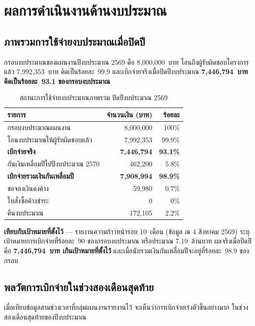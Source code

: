\chapter{ผลการดำเนินงานด้านงบประมาณ}

\section{ภาพรวมการใช้จ่ายงบประมาณเมื่อปิดปี}
กรอบงบประมาณของแผนงานปีงบประมาณ 2569 คือ 8,000,000~บาท โอนถึงผู้รับผิดชอบโครงการแล้ว
7,992,353~บาท คิดเป็นร้อยละ~99.9 และเบิกจ่ายจริงเมื่อปิดปีงบประมาณ \textbf{7,446,794~บาท
คิดเป็นร้อยละ~93.1 ของกรอบงบประมาณ}

\begin{table}[H]
\centering
\caption{สถานะการใช้จ่ายงบประมาณภาพรวม ปิดปีงบประมาณ 2569}
\small
\begin{tabular}{L{7.4cm}rr}
\toprule
{}
\textbf{รายการ} & \textbf{จำนวนเงิน (บาท)} & \textbf{ร้อยละ}\\
\midrule
กรอบงบประมาณแผนงาน & 8,000,000 & 100\%\\
โอนงบประมาณให้ผู้รับผิดชอบแล้ว & 7,992,353 & 99.9\%\\
\textbf{เบิกจ่ายจริง} & \textbf{7,446,794} & \textbf{93.1\%}\\
กันเงินเหลื่อมปีไปปีงบประมาณ 2570 & 462,200 & 5.8\%\\
\textbf{เบิกจ่ายรวมเงินกันเหลื่อมปี} & \textbf{7,908,994} & \textbf{98.9\%}\\
ขอจองเงินคงค้าง & 59,980 & 0.7\%\\
ใบสั่งซื้อค้างชำระ & 0 & 0\%\\
คืนงบประมาณ & 172,105 & 2.2\%\\
\bottomrule
\end{tabular}
\end{table}

\begin{tipbox}
\textbf{เทียบกับเป้าหมายที่ตั้งไว้} --- รายงานความก้าวหน้ารอบ 10~เดือน (ข้อมูล ณ 4 สิงหาคม 2569)
ระบุเป้าหมายการเบิกจ่ายที่ร้อยละ~90 ของกรอบงบประมาณ หรือประมาณ 7.19~ล้านบาท
ผลจริงเมื่อปิดปีคือ \textbf{7,446,794~บาท เกินเป้าหมายที่ตั้งไว้}
และเมื่อนับรวมเงินกันเหลื่อมปีจะอยู่ที่ร้อยละ~98.9 ของกรอบ
\end{tipbox}

\section{พลวัตการเบิกจ่ายในช่วงสองเดือนสุดท้าย}
เมื่อเทียบข้อมูลสามช่วงเวลาที่กลุ่มแผนงานรายงานไว้ จะเห็นว่าการเบิกจ่ายเร่งตัวขึ้นอย่างมาก
ในช่วงสองเดือนสุดท้ายของปีงบประมาณ


